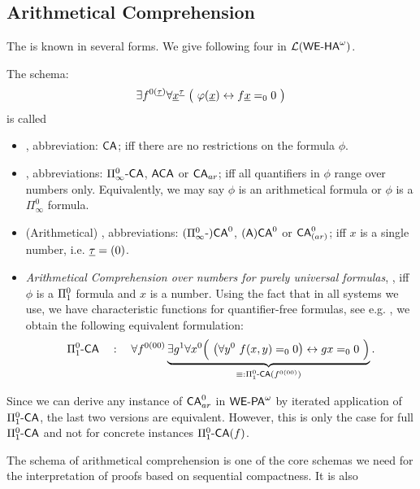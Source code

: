 \subsection {Arithmetical Comprehension}\label{ss:CA}
{\samepage
The  is known in several forms.
We give following four in $\mathcal{L}({\textsf{\upshape WE-HA}}^{\omega})$.
\begin{dfn}%
\label{d:CA}
The schema:
\[
\exists f^{0(\tup\tau)}\forall\tup x^{\tup \tau}\ \big(\ \phi(\tup x) \leftrightarrow f\tup x=_00\ \big)
\]
is called
\begin{itemize}
\item {},
abbreviation: $\textsf{\upshape CA}$; iff there are no restrictions on the formula $\phi$.
\item {}, abbreviations: 
 $\Pi^0_\infty\textsf{\upshape -CA}$,  $\textsf{\upshape ACA}$ or $\textsf{\upshape CA}_{ar}$; iff all quantifiers in $\phi$ 
range over numbers only. Equivalently, we may say 
$\phi$ is an arithmetical formula or $\phi$ is a $\Pi^0_\infty$ formula. 
\item (Arithmetical) , abbreviations:
 $(\Pi^0_\infty\textsf{\upshape -})\textsf{\upshape CA}^0$,  $(\textsf{\upshape A})\textsf{\upshape CA}^0$ or $\textsf{\upshape CA}^0_{(ar)}$; 
iff $x$ is a single number, i.e. $\underline\tau=(0)$. 
\item {\em Arithmetical Comprehension over numbers for purely universal formulas}, 
, iff
$\phi$ is a $\Pi^0_1$ formula and $x$ is a number. Using the fact that 
in all systems we use, we have characteristic functions for 
quantifier-free formulas, see e.g. \cite{Kohlenbach08}, we obtain the following 
equivalent formulation:
\[
\PiLm\CA\quad:\quad\forall f^{0(00)}\underbrace {\exists g^1\forall x^0
  \Big(\ \big(\forall y^0\ f(x,y)=_00\big) \leftrightarrow g x=_00\ \Big)}_{\equiv:\PiLm\CA(f^{0(00)})}\text{.}
\]
\end{itemize}
\end{dfn}
} %
\begin{rmk} Since we can derive any instance of $\textsf{\upshape CA}^0_{ar}$ in ${\textsf{\upshape WE-PA}}^{\omega}$
by iterated application of $\Pi^0_1\textsf{\upshape -}\textsf{\upshape CA}$, the last two versions are
equivalent. However, this is only the case for full $\Pi^0_1\textsf{\upshape -}\textsf{\upshape CA}$ and not
for concrete instances $\Pi^0_1\textsf{\upshape -}\textsf{\upshape CA}(f)$.\end{rmk}
The schema of arithmetical comprehension is one of the core schemas we need for the
interpretation of proofs based on sequential compactness. It is also
